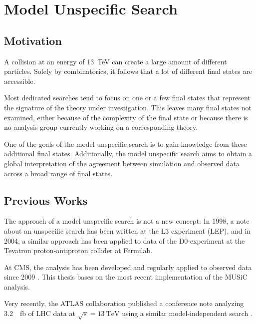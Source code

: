 
\chapter{Model Unspecific Search}

\section{Motivation}
A collision at an energy of \SI{13}{\TeV} can create a large amount of different particles. Solely by combinatorics, it follows that a lot of different final states are accessible.

Most dedicated searches tend to focus on one or a few final states that represent the signature of the theory under investigation. This leaves many final states not examined, either because of the complexity of the final state or because there is no analysis group currently working on a corresponding theory.

One of the goals of the model unspecific search is to gain knowledge from these additional final states. Additionally, the model unspecific search aims to obtain a global interpretation of the agreement between simulation and observed data across a broad range of final states.

\section{Previous Works}
The approach of a model unspecific search is not a new concept: In 1998, a note about an unspecific search has been written at the L3 experiment (\ac{LEP})\cite{Hebbeker:GlobalComparisonL3}, and in 2004, a similar approach has been applied to data of the D0-experiment at the Tevatron proton-antiproton collider at Fermilab\cite{Biallass:ModelIndependentSearch}.

At \ac{CMS}, the analysis has been developed and regularly applied to observed data since 2009\cite{Schmitz:ModelUnspecificSearch,Hof:ImplementationModelIndependent,Dietz-Laursonn:ModelUnspecificSearch,Olschewski:StudyAlternativeStatistical,Brodski:ModelUnspecificSearch,Pieta:MUSiCModelUnspecific,Papacz:ModelUnspecificSearch,Albert:ExtensionModelUnspecific} . 
This thesis bases on the most recent implementation of the \ac{MUSiC} analysis.

Very recently, the \ac{ATLAS} collaboration published a conference note analyzing \SI{3.2}{\per\femto\barn} of \ac{LHC} data at $\sqrt{s} = \SI{13}{\TeV}$ using a similar model-independent search \cite{ATLAS:ATLAS-CONF-2017-001}. 

